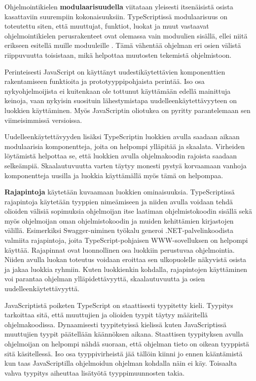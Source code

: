 \documentclass[utf8]{gradu3}
\begin{document}
Ohjelmointikielen \textbf{modulaarisuudella} viitataan yleisesti itsenäisistä osista kasattaviin suurempiin kokonaisuuksiin. TypeScriptissä modulaarisuus on toteutettu siten, että muuttujat, funktiot, luokat ja muut vastaavat ohjelmointikielen perusrakenteet ovat olemassa vain moduulien sisällä, ellei niitä erikseen esitellä muille moduuleille \parencite[]{typescript-modules}. Tämä vähentää ohjelman eri osien välistä riippuvuutta toisistaan, mikä helpottaa muutosten tekemistä ohjelmistoon.

Perinteisesti JavaScript on käyttänyt uudestikäytettävien komponenttien rakentamiseen funktioita ja prototyyppipohjaista perintää. Iso osa nykyohjelmoijista ei kuitenkaan ole tottunut käyttämään edellä mainittuja keinoja, vaan nykyisin suosituin lähestymistapa uudelleenkäytettävyyteen on luokkien käyttäminen. Myös JavaScriptin oliotukea on pyritty parantelemaan sen viimeisimmissä versioissa. \parencite[]{typescript-classes}

Uudelleenkäytettävyyden lisäksi TypeScriptin luokkien avulla saadaan aikaan modulaarisia komponentteja, joita on helpompi ylläpitää ja skaalata. Virheiden löytämistä helpottaa se, että luokkien avulla ohjelmakoodin rajoista saadaan selkeämpiä. Skaalautuvuutta varten täytyy monesti pystyä korvaamaan vanhoja komponentteja uusilla ja luokkia käyttämällä myös tämä on helpompaa.

\textbf{Rajapintoja} käytetään kuvaamaan luokkien ominaisuuksia. TypeScriptissä rajapintoja käytetään tyyppien nimeämiseen ja niiden avulla voidaan tehdä olioiden välisiä sopimuksia ohjelmoijan itse laatiman ohjelmistokoodin sisällä sekä myös ohjelmoijan oman ohjelmistokoodin ja muiden kehittämien kirjastojen välillä. \parencite[]{typescript-interfaces} Esimerkiksi Swagger-niminen työkalu generoi .NET-palvelinkoodista valmiita rajapintoja, joita TypeScript-pohjaisen WWW-sovelluksen on helpompi käyttää. Rajapinnat ovat luonnollinen osa luokkiin perustuvaa ohjelmointia. Niiden avulla luokan toteutus voidaan eroittaa sen ulkopuolelle näkyvistä osista ja jakaa luokkia ryhmiin. Kuten luokkienkin kohdalla, rajapintojen käyttäminen voi parantaa ohjelman ylläpidettävyyttä, skaalautuvuutta ja osien uudelleenkäytettävyyttä.

JavaScriptistä poiketen TypeScript on staattisesti tyypitetty kieli. Tyypitys tarkoittaa sitä, että muuttujien ja olioiden tyypit täytyy määritellä ohjelmakoodissa. Dynaamisesti tyypitetyissä kielissä kuten JavaScriptissä muuttujien tyypit päätellään käännöksen aikana. Staattisen tyypityksen avulla ohjelmoijan on helpompi nähdä suoraan, että ohjelman tieto on oikean tyyppistä sitä käsitellessä. Iso osa tyyppivirheistä jää tällöin kiinni jo ennen kääntämistä kun taas JavaScriptilla ohjelmoidun ohjelman kohdalla näin ei käy. Toisaalta vahva tyypitys aiheuttaa lisätyötä tyyppimuunnosten takia.
\end{document}
